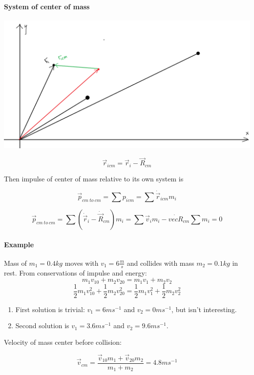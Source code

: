  \paragraph{System of center of mass}
 	\begin{center}
 	\includegraphics[width=\linewidth]{./lect12/pic2.png}
 \end{center}
 
 $$\vec{r}_{icm} = \vec{r}_i - \vec{R}_{cm}$$
 
 Then impulse of center of mass relative to its own system is
 
 $$\vec{p}_{cm\:to\:cm} = \sum p_{icm} = \sum \dot{\vec{r}}_{icm} m_i$$
 
 $$\vec{p}_{cm\:to\:cm}  = \sum \left( \dot{\vec{r}}_i - \dot{\vec{R}}_{cm}\right) m_i = \sum \vec{v}_i m_i - \dot{vec{R}}_{cm} \sum m_i = 0$$
 
 \paragraph{Example} Mass of $m_1=0.4kg$ moves with $v_1 = 6 \frac{m}{s}$ and collides with mass $m_2=0.1kg$ in rest. From conservations of impulse and energy:
 $$m_1v_{10}+m_2v_{20} = m_1v_1+m_2v_2$$ 
 $$\frac{1}{2}m_1v^2_{10}+\frac{1}{2}m_2v^2_{20} = \frac{1}{2}m_1v^2_1+\frac{1}{2}m_2v^2_2$$ 
 
 \begin{enumerate}
 	\item First solution is trivial: $v_1=6 ms^{-1}$ and $v_2 = 0 ms^{-1}$, but isn't interesting.
 	\item Second solution is $v_1=3.6 ms^{-1}$ and $v_2 =9.6 ms^{-1}$.
 \end{enumerate}
 
 Velocity of mass center before collision:
 
 $$\vec{v}_{cm} = \frac{\vec{v}_{10} m_1 + \vec{v}_{20} m_2 }{m_1+m_2} = 4.8 ms^{-1}$$
 
